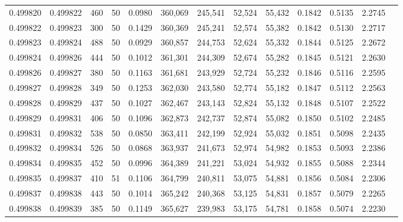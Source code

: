 \begin{tabular}{rrrrrrrrrrrrr}
0.499820 & 0.499822 & 460 &  50 &                                     0.0980 & 360,069 & 245,541 &  52,524 &  55,432 & 0.1842 & 0.5135 & 2.2745 \\
0.499822 & 0.499823 & 300 &  50 &                                     0.1429 & 360,369 & 245,241 &  52,574 &  55,382 & 0.1842 & 0.5130 & 2.2717 \\
0.499823 & 0.499824 & 488 &  50 &                                     0.0929 & 360,857 & 244,753 &  52,624 &  55,332 & 0.1844 & 0.5125 & 2.2672 \\
0.499824 & 0.499826 & 444 &  50 &                                     0.1012 & 361,301 & 244,309 &  52,674 &  55,282 & 0.1845 & 0.5121 & 2.2630 \\
0.499826 & 0.499827 & 380 &  50 &                                     0.1163 & 361,681 & 243,929 &  52,724 &  55,232 & 0.1846 & 0.5116 & 2.2595 \\
0.499827 & 0.499828 & 349 &  50 &                                     0.1253 & 362,030 & 243,580 &  52,774 &  55,182 & 0.1847 & 0.5112 & 2.2563 \\
0.499828 & 0.499829 & 437 &  50 &                                     0.1027 & 362,467 & 243,143 &  52,824 &  55,132 & 0.1848 & 0.5107 & 2.2522 \\
0.499829 & 0.499831 & 406 &  50 &                                     0.1096 & 362,873 & 242,737 &  52,874 &  55,082 & 0.1850 & 0.5102 & 2.2485 \\
0.499831 & 0.499832 & 538 &  50 &                                     0.0850 & 363,411 & 242,199 &  52,924 &  55,032 & 0.1851 & 0.5098 & 2.2435 \\
0.499832 & 0.499834 & 526 &  50 &                                     0.0868 & 363,937 & 241,673 &  52,974 &  54,982 & 0.1853 & 0.5093 & 2.2386 \\
0.499834 & 0.499835 & 452 &  50 &                                     0.0996 & 364,389 & 241,221 &  53,024 &  54,932 & 0.1855 & 0.5088 & 2.2344 \\
0.499835 & 0.499837 & 410 &  51 &                                     0.1106 & 364,799 & 240,811 &  53,075 &  54,881 & 0.1856 & 0.5084 & 2.2306 \\
0.499837 & 0.499838 & 443 &  50 &                                     0.1014 & 365,242 & 240,368 &  53,125 &  54,831 & 0.1857 & 0.5079 & 2.2265 \\
0.499838 & 0.499839 & 385 &  50 &                                     0.1149 & 365,627 & 239,983 &  53,175 &  54,781 & 0.1858 & 0.5074 & 2.2230 \\

\end{tabular}
